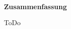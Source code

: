 
~

\vspace{17.1mm}

\begin{flushleft}
    \textbf{\huge{}Zusammenfassung}{\huge\par}
\par\end{flushleft}

ToDo

